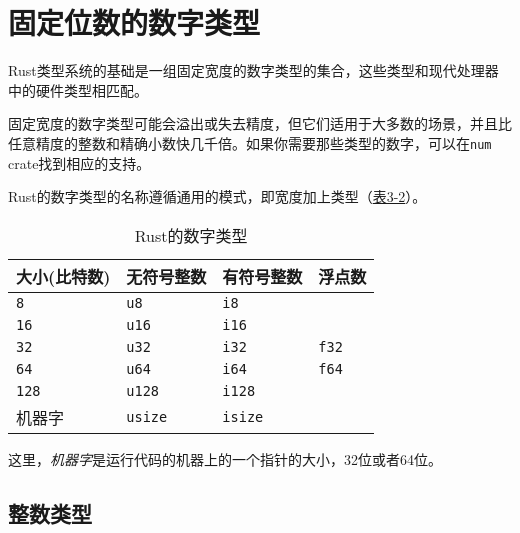 \section{固定位数的数字类型}
Rust类型系统的基础是一组固定宽度的数字类型的集合，这些类型和现代处理器中的硬件类型相匹配。

固定宽度的数字类型可能会溢出或失去精度，但它们适用于大多数的场景，并且比任意精度的整数和精确小数快几千倍。如果你需要那些类型的数字，可以在\texttt{num} crate找到相应的支持。

Rust的数字类型的名称遵循通用的模式，即宽度加上类型（\hyperref[t3-2]{表3-2}）。
\begin{table}[htbp]
    \centering
    \caption{Rust的数字类型}
    \label{t3-2}
    \begin{tabular}{llll}
        \hline
        \textbf{大小(比特数)}   & \textbf{无符号整数}   & \textbf{有符号整数}   & \textbf{浮点数}   \\
        \hline
        \texttt{8}  & \texttt{u8}   & \texttt{i8}   &              \\
        \rowcolor{tablecolor}
        \texttt{16} & \texttt{u16}  & \texttt{i16}  &              \\
        \texttt{32} & \texttt{u32}  & \texttt{i32}  & \texttt{f32} \\
        \rowcolor{tablecolor}
        \texttt{64} & \texttt{u64}  & \texttt{i64}  & \texttt{f64} \\
        \texttt{128}& \texttt{u128} & \texttt{i128} &              \\
        \rowcolor{tablecolor}
        机器字      & \texttt{usize} & \texttt{isize} & \\
    \end{tabular}
\end{table}

这里，\emph{机器字}是运行代码的机器上的一个指针的大小，32位或者64位。

\subsection{整数类型}

